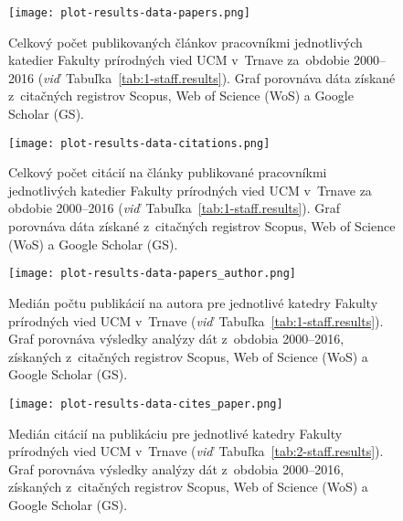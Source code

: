 \begin{figure}
  \centering
  \texttt{[image: plot-results-data-papers.png]}
  \caption[Celkový počet publikácií jednotlivých katedier FPV]%
  {Celkový počet publikovaných článkov pracovníkmi jednotlivých katedier Fakulty
    prírodných vied UCM v~Trnave za~obdobie 2000--2016
    (\emph{viď}~Tabuľka~\ref{tab:1-staff.results}).  Graf porovnáva dáta získané
    z~citačných registrov Scopus, Web of Science (WoS) a Google Scholar (GS).}
  \label{fig:publications.plot}
\end{figure}

\begin{figure}
  \centering
  \texttt{[image: plot-results-data-citations.png]}
  \caption[Celkový počet citácií jednotlivých katedier FPV]%
  {Celkový počet citácií na články publikované pracovníkmi jednotlivých katedier
    Fakulty prírodných vied UCM v~Trnave za obdobie 2000--2016
    (\emph{viď}~Tabuľka~\ref{tab:1-staff.results}).  Graf porovnáva dáta získané
    z~citačných registrov Scopus, Web of Science (WoS) a Google Scholar (GS).}
  \label{fig:citations.plot}
\end{figure}

\begin{figure}
  \centering
  \texttt{[image: plot-results-data-papers\_author.png]}
  \caption[Medián počtu publikácií na autora pre jednotlivé katedry FPV]%
  {Medián počtu publikácií na autora pre jednotlivé katedry Fakulty prírodných
    vied UCM v~Trnave (\emph{viď}~Tabuľka~\ref{tab:1-staff.results}).  Graf
    porovnáva výsledky analýzy dát z~obdobia 2000--2016, získaných z~citačných
    registrov Scopus, Web of Science (WoS) a Google Scholar (GS).}
  \label{fig:p/a.plot}
\end{figure}


\begin{figure}
  \centering
  \texttt{[image: plot-results-data-cites\_paper.png]}
  \caption[Medián citácií na publikáciu pre jednotlivé katedry FPV]%
  {Medián citácií na publikáciu pre jednotlivé katedry Fakulty prírodných vied
    UCM v~Trnave (\emph{viď}~Tabuľka~\ref{tab:2-staff.results}).  Graf porovnáva
    výsledky analýzy dát z~obdobia 2000--2016, získaných z~citačných registrov
    Scopus, Web of Science (WoS) a Google Scholar (GS).}
  \label{fig:c/p.plot}
\end{figure}

